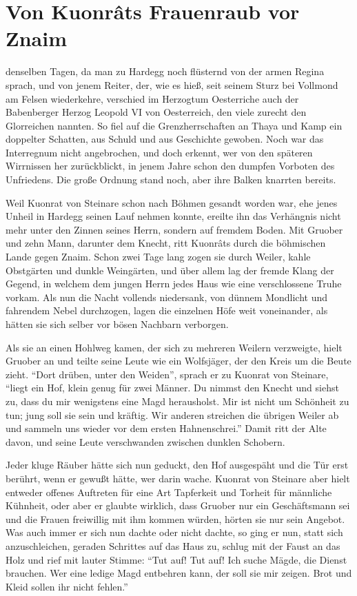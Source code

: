 
\section{Von Kuonr\^{a}ts Frauenraub vor Znaim}

 denselben Tagen, da man zu \gls{Hardegg} noch flüsternd von der armen \gls{Regina} sprach, und von jenem Reiter, der, wie es hieß, seit seinem Sturz bei Vollmond am Felsen wiederkehre, verschied im Herzogtum \gls{Oesterriche} auch der Babenberger Herzog \gls{Leopold VI von Oesterreich}, den viele zurecht den Glorreichen nannten. So fiel auf die Grenzherrschaften an Thaya und Kamp ein doppelter Schatten, aus Schuld und aus Geschichte gewoben. Noch war das \gls{Interregnum} nicht angebrochen, und doch erkennt, wer von den späteren Wirrnissen her zurückblickt, in jenem Jahre schon den dumpfen Vorboten des Unfriedens. Die große Ordnung stand noch, aber ihre Balken knarrten bereits.

Weil \gls{Kuonrat von Steinare} schon nach Böhmen gesandt worden war, ehe jenes Unheil in \gls{Hardegg} seinen Lauf nehmen konnte, ereilte ihn das Verhängnis nicht mehr unter den Zinnen seines Herrn, sondern auf fremdem Boden. Mit \gls{Gruober} und zehn Mann, darunter dem \gls{Knecht}, ritt Kuonr\^{a}ts durch die böhmischen Lande gegen \gls{Znaim}. Schon zwei Tage lang zogen sie durch Weiler, kahle Obstgärten und dunkle Weingärten, und über allem lag der fremde Klang der Gegend, in welchem dem jungen Herrn jedes Haus wie eine verschlossene Truhe vorkam. Als nun die Nacht vollends niedersank, von dünnem Mondlicht und fahrendem Nebel durchzogen, lagen die einzelnen Höfe weit voneinander, als hätten sie sich selber vor bösen Nachbarn verborgen.

Als sie an einen Hohlweg kamen, der sich zu mehreren Weilern verzweigte, hielt \gls{Gruober} an und teilte seine Leute wie ein Wolfsjäger, der den Kreis um die Beute zieht. \enquote{Dort drüben, unter den Weiden}, sprach er zu \gls{Kuonrat von Steinare}, \enquote{liegt ein Hof, klein genug für zwei Männer. Du nimmst den \gls{Knecht} und siehst zu, dass du mir wenigstens eine Magd herausholst. Mir ist nicht um Schönheit zu tun; jung soll sie sein und kräftig. Wir anderen streichen die übrigen Weiler ab und sammeln uns wieder vor dem ersten Hahnenschrei.} Damit ritt der Alte davon, und seine Leute verschwanden zwischen dunklen Schobern.

Jeder kluge Räuber hätte sich nun geduckt, den Hof ausgespäht und die Tür erst berührt, wenn er gewußt hätte, wer darin wache. \gls{Kuonrat von Steinare} aber hielt entweder offenes Auftreten für eine Art Tapferkeit und Torheit für männliche Kühnheit, oder aber er glaubte wirklich, dass \gls{Gruober} nur ein Geschäftsmann sei und die Frauen freiwillig mit ihm kommen würden, hörten sie nur sein Angebot. Was auch immer er sich nun dachte oder nicht dachte, so ging er nun, statt sich anzuschleichen, geraden Schrittes auf das Haus zu, schlug mit der Faust an das Holz und rief mit lauter Stimme: \enquote{Tut auf! Tut auf! Ich suche Mägde, die Dienst brauchen. Wer eine ledige Magd entbehren kann, der soll sie mir zeigen. Brot und Kleid sollen ihr nicht fehlen.}

